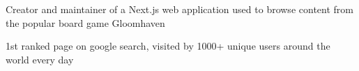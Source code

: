 \documentclass[]{resume}
\begin{document}

\separatorLine
{} \hfill {}
\begin{tightemize}
\item Creator and maintainer of a Next.js web application used to browse content from the popular board game Gloomhaven
\item 1st ranked page on google search, visited by 1000+ unique users around the world every day
\end{tightemize}
 

\separatorLine
{}
 
\end{document}
